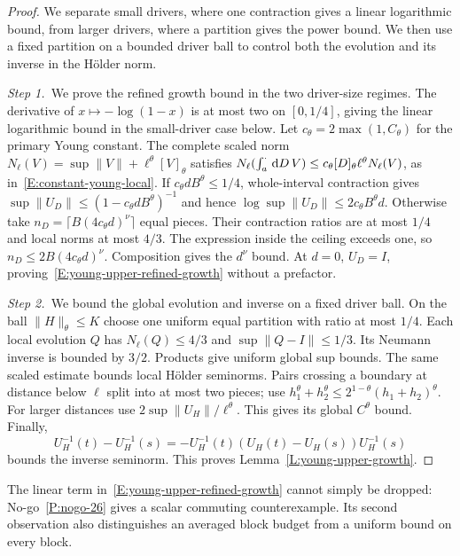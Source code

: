 \begin{proof}
  We separate small drivers, where one contraction gives a linear logarithmic
  bound, from larger drivers, where a partition gives the power bound. We then
  use a fixed partition on a bounded driver ball to control both the evolution
  and its inverse in the Hölder norm.


  \medskip
  \noindent\textit{Step 1.~}We prove the refined growth bound in the two
  driver-size regimes.
  The derivative of $x\mapsto-\log(1-x)$ is at most two on $[0,1/4]$, giving
  the linear logarithmic bound in the small-driver case below.
  Let $c_\theta = 2\max(1,C_\theta)$ for the primary Young constant. The
  complete scaled norm $N_\ell(V) = \sup\|V\|+\ell^\theta[V]_\theta$ satisfies
  $N_\ell(\int_a^\cdot\,\mathrm{d} D\,V) \le c_\theta[D]_\theta\ell^\theta N_\ell(V)$, as
  in~\eqref{E:constant-young-local}. If $c_\theta dB^\theta \le 1/4$,
  whole-interval contraction gives $\sup\|U_D\| \le (1-c_\theta dB^\theta)^{-1}$
  and hence $\log\sup\|U_D\| \le 2c_\theta B^\theta d$. Otherwise take $n_D =
  \lceil B(4c_\theta d)^\nu\rceil$ equal pieces. Their contraction ratios are at
  most $1/4$ and local norms at most $4/3$. The expression inside the ceiling
  exceeds one, so $n_D \le 2B(4c_\theta d)^\nu$. Composition gives the $d^\nu$
  bound. At $d = 0$, $U_D = I$, proving~\eqref{E:young-upper-refined-growth}
  without a prefactor.


  \medskip
  \noindent\textit{Step 2.~}We bound the global evolution and inverse on a
  fixed driver ball.
  On the ball $\|H\|_\theta \le K$ choose one uniform equal partition with ratio
  at most $1/4$. Each local evolution $Q$ has $N_\ell(Q) \le 4/3$ and
  $\sup\|Q-I\| \le 1/3$. Its Neumann inverse is bounded by $3/2$. Products give
  uniform global sup bounds. The same scaled estimate bounds local H\"older
  seminorms. Pairs crossing a boundary at distance below $\ell$ split into at
  most two pieces; use $h_1^\theta+h_2^\theta \le 2^{1-\theta}(h_1+h_2)^\theta$.
  For larger distances use $2\sup\|U_H\|/\ell^\theta$. This gives its global
  $C^\theta$ bound. Finally,
  \[
    U_H^{-1}(t)-U_H^{-1}(s)
    =-U_H^{-1}(t)(U_H(t)-U_H(s))U_H^{-1}(s)
  \]
  bounds the inverse seminorm. This proves Lemma~\ref{L:young-upper-growth}.
\end{proof}

The linear term in~\eqref{E:young-upper-refined-growth} cannot simply be
dropped: No-go~\ref{P:nogo-26} gives a scalar commuting counterexample.
Its second observation also distinguishes an averaged block budget from
a uniform bound on every block.


